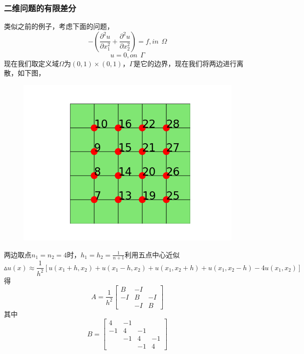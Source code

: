 \documentclass{article}
\begin{document}
\subsubsection{二维问题的有限差分}
类似之前的例子，考虑下面的问题，
$$-(\dfrac{\partial ^2u}{\partial x_1^2}+\dfrac{\partial ^2u}{\partial x_2^2})=f,in ~~\Omega $$
$$u=0, on ~~\Gamma$$
现在我们取定义域$\Omega$为$(0,1)\times (0,1)$，$\Gamma$是它的边界，现在我们将两边进行离散，如下图，
\begin{figure}[H]
\centering
\includegraphics[scale=0.7]{./figures/1.png}
\caption{}
\end{figure}
两边取点$n_1=n_2=4$时，$h_1=h_2=\frac{1}{n+1}$利用五点中心近似
$$\vartriangle u(x)\approx\frac{1}{h^2}[u(x_1+h,x_2)+u(x_1-h,x_2)+u(x_1,x_2+h)+u(x_1,x_2-h)-4u(x_1,x_2)]$$
得
$$A=\frac{1}{h^2}\begin{bmatrix}
B & {-I}\\
-I & B & {-I}\\
 & {-I} & B
\end{bmatrix}$$
其中
$$B=\begin{bmatrix}
4 & {-1}\\
-1 & 4 & {-1}\\
  & {-1} & 4 & {-1}\\
  & & {-1} & 4
 \end{bmatrix}$$
\end{document}
